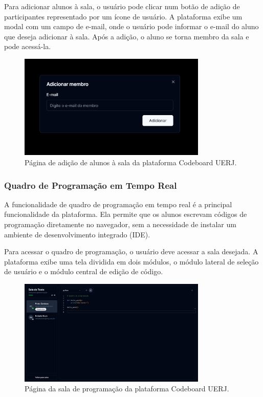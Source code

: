 Para adicionar alunos à sala, o usuário pode clicar num botão de adição de participantes representado por um ícone de usuário. A plataforma exibe um modal com um campo de e-mail, onde o usuário pode informar o e-mail do aluno que deseja adicionar à sala. Após a adição, o aluno se torna membro da sala e pode acessá-la.

\begin{figure}[H]
    \centering
    \includegraphics[width=0.8\textwidth]{assets/codeboard/add-member-modal.png}
    \caption{Página de adição de alunos à sala da plataforma Codeboard UERJ.}
    \label{fig:add-member-modal}
\end{figure}

\subsubsection{Quadro de Programação em Tempo Real}

A funcionalidade de quadro de programação em tempo real é a principal funcionalidade da plataforma. Ela permite que os alunos escrevam códigos de programação diretamente no navegador, sem a necessidade de instalar um ambiente de desenvolvimento integrado (IDE).

Para acessar o quadro de programação, o usuário deve acessar a sala desejada. A plataforma exibe uma tela dividida em dois módulos, o módulo lateral de seleção de usuário e o módulo central de edição de código.

\begin{figure}[H]
    \centering
    \includegraphics[width=0.8\textwidth]{assets/codeboard/room-details-page.png}
    \caption{Página da sala de programação da plataforma Codeboard UERJ.}
    \label{fig:room-details-page}
\end{figure}


